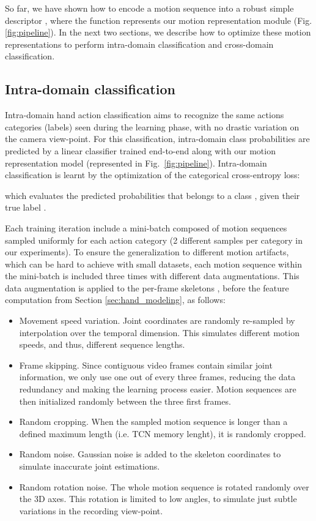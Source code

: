 \documentclass[letterpaper, 10 pt, conference]{ieeeconf}
\begin{document}
So far, we have shown how to encode a motion sequence  into a robust simple descriptor , where the function  represents our motion representation module (Fig. \ref{fig:pipeline}). In the next two sections, we describe how to optimize these motion representations to perform intra-domain classification and cross-domain classification.



\subsection{Intra-domain classification}\label{sec:intra_dom}

Intra-domain hand action classification aims to recognize the same actions categories (labels) seen during the learning phase, with no drastic variation on the camera view-point. For this classification, intra-domain class probabilities  are predicted by a linear classifier  trained end-to-end along with our motion representation model  (represented in Fig.~\ref{fig:pipeline}). Intra-domain classification is learnt by the optimization of the categorical cross-entropy loss:


which evaluates the predicted probabilities  that belongs to a class , given their true label .


Each training iteration include a mini-batch composed of motion sequences sampled uniformly for each action category (2 different samples per category in our experiments).
To ensure the generalization to different motion artifacts, which can be hard to achieve with small datasets,
each motion sequence within the mini-batch is included three times with different data augmentations. This data augmentation is applied to the per-frame skeletons , before the feature computation from Section \ref{sec:hand_modeling}, as follows:
\begin{itemize}
    \item Movement speed variation. Joint coordinates are randomly re-sampled by interpolation over the temporal dimension. This simulates different motion speeds, and thus, different sequence lengths.
    \item Frame skipping. Since contiguous video frames contain similar joint information, we only use one out of every three frames, reducing the data redundancy and making the learning process easier. Motion sequences are then initialized randomly between the three first frames.
    \item Random cropping. When the sampled motion sequence is longer than a defined maximum length (i.e. TCN memory lenght), it is randomly cropped.
    \item Random noise. Gaussian noise is added to the skeleton coordinates to simulate inaccurate joint estimations.
    \item Random rotation noise. The whole motion sequence is rotated randomly over the 3D axes. This rotation is limited to low angles, to simulate just subtle variations in the recording view-point. 
\end{itemize}
\end{document}

